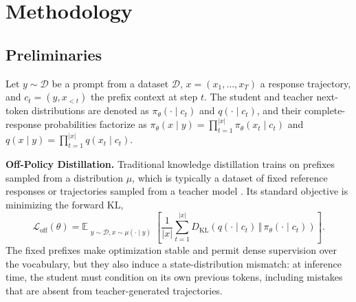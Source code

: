 \documentclass{article} %
\begin{document}
\section{Methodology}
\label{sec:method}

\subsection{Preliminaries}

Let $y\sim\mathcal{D}$ be a prompt from a dataset $\mathcal{D}$, $x=(x_1,\ldots,x_T)$ a response trajectory, and $c_t=(y,x_{<t})$ the prefix context at step $t$. The student and teacher next-token distributions are denoted as $\pi_\theta(\cdot\mid c_t)$ and $q(\cdot\mid c_t)$, and their complete-response probabilities factorize as $\pi_\theta(x\mid y)=\prod_{t=1}^{|x|}\pi_\theta(x_t\mid c_t)$ and $q(x\mid y)=\prod_{t=1}^{|x|}q(x_t\mid c_t)$.


\noindent\textbf{Off-Policy Distillation.}
Traditional knowledge distillation trains on prefixes sampled from a distribution $\mu$, which is typically a dataset of fixed reference responses or trajectories sampled from a teacher model \citep{hinton2015distilling, kim2016sequence}.  
Its standard objective is minimizing the forward KL, 
\begin{equation}
    \mathcal{L}_{\mathrm{off}}(\theta)
    = \mathbb{E}_{\substack{y\sim\mathcal{D}, x\sim \mu(\cdot\mid y)}}
    \left[
    \frac{1}{|x|}\sum_{t=1}^{|x|}
    D_{\mathrm{KL}}\!\left(
        q(\cdot\mid c_t)\,\Vert\,\pi_\theta(\cdot\mid c_t)
    \right)
    \right].
    \label{eq:off_policy_kd}
\end{equation}
The fixed prefixes make optimization stable and permit dense supervision over the vocabulary, but they also induce a state-distribution mismatch: at inference time, the student must condition on its own previous tokens, including mistakes that are absent from teacher-generated trajectories.
\end{document}
